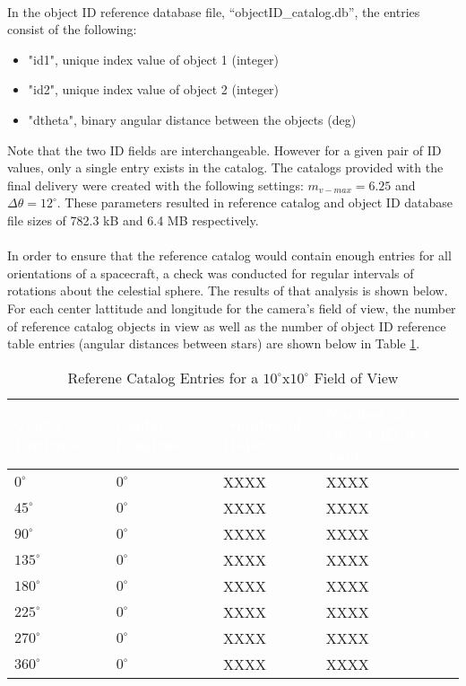 \documentclass[]{DINOReportMemo}
\begin{document}
\\
In the object ID reference database file, ``objectID\_catalog.db'', the entries consist of the following: \\
\begin{itemize}
	\item "id1", unique index value of object 1 (integer)
	\item "id2", unique index value of object 2 (integer)
	\item "dtheta", binary angular distance between the objects (deg) \\
\end{itemize}
Note that the two ID fields are interchangeable. However for a given pair of ID values, only a single entry exists in the catalog. The catalogs provided with the final delivery were created with the following settings: $m_{v-max} = 6.25$ and $\Delta\theta = 12^{\circ}$. These parameters resulted in reference catalog and object ID database file sizes of 782.3 kB and 6.4 MB respectively. \\
\\
In order to ensure that the reference catalog would contain enough entries for 	all orientations of a spacecraft, a check was conducted for regular intervals of rotations about the celestial sphere. The results of that analysis is shown below. For each center lattitude and longitude for the camera's field of view, the number of reference catalog objects in view as well as the number of object ID reference table entries (angular distances between stars) are shown below in Table \ref{tab:inputLSimTable}. \\

\begin{table}[H]
	\centering
	\caption{Referene Catalog Entries for a $10^{\circ}$x$10^{\circ}$ Field of View}
	\begin{tabular}{|l|l|l|l|}
		\hline
		\rowcolor{CU_Gold}
		\textcolor{white}{Center Lattitude} & 
		\textcolor{white}{Center Longitude} & 
		\textcolor{white}{Number of Objects} & 
		\textcolor{white}{Number of Object ID Ref Values}  \\ \hline
		$0^{\circ}$ & $0^{\circ}$ & XXXX & XXXX \\ \hline
		$45^{\circ}$ & $0^{\circ}$ & XXXX & XXXX \\ \hline
		$90^{\circ}$ & $0^{\circ}$ & XXXX & XXXX \\ \hline
		$135^{\circ}$ & $0^{\circ}$ & XXXX & XXXX \\ \hline
		$180^{\circ}$ & $0^{\circ}$ & XXXX & XXXX \\ \hline
		$225^{\circ}$ & $0^{\circ}$ & XXXX & XXXX \\ \hline
		$270^{\circ}$ & $0^{\circ}$ & XXXX & XXXX \\ \hline
		$360^{\circ}$ & $0^{\circ}$ & XXXX & XXXX \\ \hline
	\end{tabular}
	\label{tab:inputLSimTable} \\
\end{table} 
\end{document}
